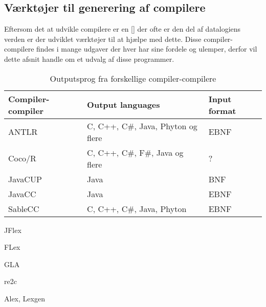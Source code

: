 \subsection{Værktøjer til generering af compilere}

Eftersom det at udvikle compilere er en [] der ofte er den del af datalogiens verden er der udviklet værktøjer til at hjælpe med dette. Disse compiler-compilere findes i mange udgaver der hver har sine fordele og ulemper, derfor vil dette afsnit handle om et udvalg af disse programmer.

\begin{table}[H]
\centering
\footnotesize
\begin{tabular}{l l l}
\toprule
\textbf{Compiler-compiler}  &\textbf{Output languages}              &\textbf{Input format}  \\\midrule
ANTLR                       & C, C++, C\#, Java, Phyton og flere    & EBNF                  \\
Coco/R                      & C, C++, C\#, F\#, Java og flere       & ?                     \\
JavaCUP                     & Java                                  & BNF                   \\
JavaCC                      & Java                                  & EBNF                  \\
SableCC                     & C, C++, C\#, Java, Phyton             & EBNF                  \\\bottomrule
\end{tabular}
\caption{Outputsprog fra forskellige compiler-compilere}
\label{tab:compileroutput}
\end{table}

JFlex

FLex

GLA

re2c

Alex, Lexgen

